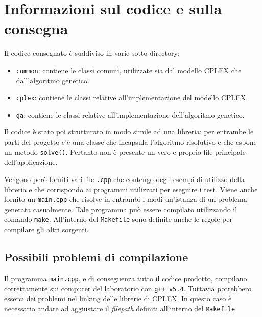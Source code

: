 
\section{Informazioni sul codice e sulla consegna}

Il codice consegnato è suddiviso in varie sotto-directory:

\begin{itemize}
	\item \texttt{common}: contiene le classi comuni, utilizzate sia dal modello CPLEX che dall'algoritmo genetico.
	\item \texttt{cplex}: contiene le classi relative all'implementazione del modello CPLEX.
	\item \texttt{ga}: contiene le classi relative all'implementazione dell'algoritmo genetico.
\end{itemize}

Il codice è stato poi strutturato in modo simile ad una libreria: per entrambe le parti del progetto c'è una classe che incapsula l'algoritmo risolutivo e che espone un metodo \texttt{solve()}.
Pertanto non è presente un vero e proprio file principale dell'applicazione.

Vengono però forniti vari file \texttt{.cpp} che contengo degli esempi di utilizzo della libreria e che corrispondo ai programmi utilizzati per eseguire i test.
Viene anche fornito un \texttt{main.cpp} che risolve in entrambi i modi un'istanza di un problema generata casualmente. Tale programma può essere compilato utilizzando il comando \texttt{make}.
All'interno del \texttt{Makefile} sono definite anche le regole per compilare gli altri sorgenti.


\subsection{Possibili problemi di compilazione}

Il programma \texttt{main.cpp}, e di conseguenza tutto il codice prodotto, compilano correttamente sui computer del laboratorio con \texttt{g++ v5.4}.
Tuttavia potrebbero esserci dei problemi nel linking delle librerie di CPLEX. In questo caso è necessario andare ad aggiustare il \textit{filepath} definiti all'interno del \texttt{Makefile}.
